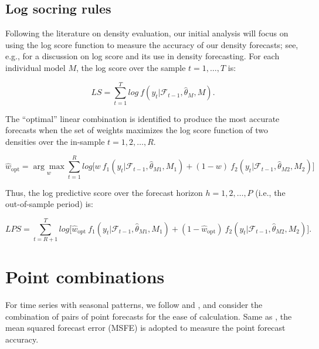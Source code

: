 \documentclass{monashthesis}
\begin{document}
\hypertarget{log-socring-rules}{%
\subsection{Log socring rules}\label{log-socring-rules}}

Following the literature on density evaluation, our initial analysis will focus on using the log score function to measure the accuracy of our density forecasts; see, e.g., \textcite{GA11} for a discussion on log score and its use in density forecasting. For each individual model \(M\), the log score over the sample \(t = 1, \dots, T\) is:

\begin{equation}
\label{eqn:LS1}
LS = \sum^T_{t=1} log \ f(y_t| \mathcal{F}_{t-1}, \hat\theta_M, M).
\end{equation}

The ``optimal'' linear combination is identified to produce the most accurate forecasts when the set of weights maximizes the log score function of two densities over the in-sample \(t = 1, 2, \dots, R\).

\begin{equation}
\label{eqn:LS2}
\hat{w}_{\text{opt}} = \underset{w}{\arg\max} \sum^R_{t=1} log \Big[ w \ f_1(y_t| \mathcal{F}_{t-1}, \hat\theta_{M1}, M_1) + (1-w) \ f_2(y_t| \mathcal{F}_{t-1}, \hat\theta_{M2}, M_2)\Big]
\end{equation}

Thus, the log predictive score over the forecast horizon \(h = 1, 2, \dots, P\) (i.e., the out-of-sample period) is:

\begin{equation}
\label{eqn:LS3}
LPS = \sum^T_{t = R+1} log \Big[ \hat{w}_{\text{opt}} \ f_1(y_t| \mathcal{F}_{t-1}, \hat\theta_{M1}, M_1) + (1- \hat{w}_{\text{opt}}) \ f_2(y_t| \mathcal{F}_{t-1}, \hat\theta_{M2}, M_2)\Big].
\end{equation}

\hypertarget{point-combinations}{%
\section{Point combinations}\label{point-combinations}}

For time series with seasonal patterns, we follow \textcite{BG69} and \textcite{SW09}, and consider the combination of pairs of point forecasts for the ease of calculation. Same as \textcite{SW09}, the mean squared forecast error (MSFE) is adopted to measure the point forecast accuracy.
\end{document}
